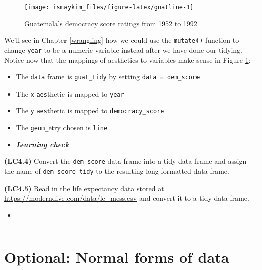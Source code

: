 \documentclass[12pt,]{krantz}
\providecommand{\tightlist}{%
  \setlength{\itemsep}{0pt}\setlength{\parskip}{0pt}}
\newenvironment{rmdblock}[1]
  {\begin{shaded*}
  \begin{itemize}
  \renewcommand{\labelitemi}{
    \raisebox{-.7\height}[0pt][0pt]{
    }
  }
  \item
  }
  {
  \end{itemize}
  \end{shaded*}
  }
\newenvironment{learncheck}
  {\begin{rmdblock}{warning}}
  {\end{rmdblock}}
\begin{document}
\begin{figure}

{\centering \texttt{[image: ismaykim\_files/figure-latex/guatline-1]} 

}

\caption{Guatemala's democracy score ratings from 1952 to 1992}\label{fig:guatline}
\end{figure}

We'll see in Chapter \ref{wrangling} how we could use the
\texttt{mutate()} function to change \texttt{year} to be a numeric
variable instead after we have done our tidying. Notice now that the
mappings of aesthetics to variables make sense in Figure
\ref{fig:guatline}:

\begin{itemize}
\tightlist
\item
  The \texttt{data} frame is \texttt{guat\_tidy} by setting
  \texttt{data\ =\ dem\_score}
\item
  The \texttt{x} \texttt{aes}thetic is mapped to \texttt{year}
\item
  The \texttt{y} \texttt{aes}thetic is mapped to
  \texttt{democracy\_score}
\item
  The \texttt{geom\_}etry chosen is \texttt{line}
\end{itemize}

\begin{learncheck}
\textbf{\emph{Learning check}}
\end{learncheck}

\textbf{(LC4.4)} Convert the \texttt{dem\_score} data frame into a tidy
data frame and assign the name of \texttt{dem\_score\_tidy} to the
resulting long-formatted data frame.

\textbf{(LC4.5)} Read in the life expectancy data stored at
\url{https://moderndive.com/data/le_mess.csv} and convert it to a tidy
data frame.

\begin{learncheck}

\end{learncheck}

\begin{center}\rule{0.5\linewidth}{\linethickness}\end{center}

\section{Optional: Normal forms of
data}\label{optional-normal-forms-of-data}
\end{document}
